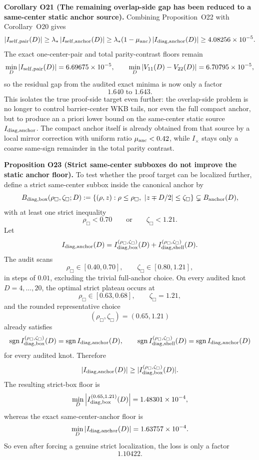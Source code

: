 \documentclass[aps,prd,onecolumn,notitlepage,nofootinbib,superscriptaddress,11pt,floatfix]{revtex4-2}
\begin{document}
\medskip\noindent\textbf{Corollary O21 (The remaining overlap-side gap has been reduced to a same-center static anchor source).}
Combining Proposition~O22 with Corollary~O20 gives
\[
|I_{\rm self,pair}(D)|
\ge
\lambda_\ast\,|I_{\rm self,anchor}(D)|
\ge
\lambda_\ast(1-\mu_{\rm anc})\,|I_{\rm diag,anchor}(D)|
\ge
4.08256\times10^{-5}.
\]
The exact one-center-pair and total parity-contrast floors remain
\[
\min_D |I_{\rm self,pair}(D)|=6.69675\times10^{-5},
\qquad
\min_D |V_{11}(D)-V_{22}(D)|=6.70795\times10^{-5},
\]
so the residual gap from the audited exact minima is now only a factor
\[
1.640\text{ to }1.643.
\]
This isolates the true proof-side target even further: the overlap-side problem is no longer to control barrier-center WKB tails, nor even the full compact anchor, but to produce an a priori lower bound on the same-center static source \(I_{\rm diag,anchor}\).  The compact anchor itself is already obtained from that source by a local mirror correction with uniform ratio \(\mu_{\rm anc}<0.42\), while \(I_\times\) stays only a coarse same-sign remainder in the total parity contrast.

\medskip\noindent\textbf{Proposition O23 (Strict same-center subboxes do not improve the static anchor floor).}
To test whether the proof target can be localized further, define a strict same-center subbox inside the canonical anchor by
\[
B_{\rm diag,box}(\rho_\Box,\zeta_\Box;D)
:=
\left\{(\rho,z):\rho\le \rho_\Box,\ |z\mp D/2|\le \zeta_\Box\right\}
\subsetneq B_{\rm anchor}(D),
\]
with at least one strict inequality
\[
\rho_\Box<0.70\qquad\text{or}\qquad \zeta_\Box<1.21.
\]
Let
\[
I_{\rm diag,anchor}(D)
=
I_{\rm diag,box}^{(\rho_\Box,\zeta_\Box)}(D)
+
I_{\rm diag,shell}^{(\rho_\Box,\zeta_\Box)}(D).
\]
The audit  scans
\[
\rho_\Box\in[0.40,0.70],\qquad
\zeta_\Box\in[0.80,1.21],
\]
in steps of \(0.01\), excluding the trivial full-anchor choice. On every audited knot \(D=4,\dots,20\), the optimal strict plateau occurs at
\[
\rho_\Box\in[0.63,0.68],\qquad \zeta_\Box=1.21,
\]
and the rounded representative choice
\[
(\rho_\Box,\zeta_\Box)=(0.65,1.21)
\]
already satisfies
\[
\operatorname{sgn} I_{\rm diag,box}^{(\rho_\Box,\zeta_\Box)}(D)
=
\operatorname{sgn} I_{\rm diag,anchor}(D),
\qquad
\operatorname{sgn} I_{\rm diag,shell}^{(\rho_\Box,\zeta_\Box)}(D)
=
\operatorname{sgn} I_{\rm diag,anchor}(D)
\]
for every audited knot. Therefore
\[
|I_{\rm diag,anchor}(D)|
\ge
|I_{\rm diag,box}^{(\rho_\Box,\zeta_\Box)}(D)|.
\]
The resulting strict-box floor is
\[
\min_D \left|I_{\rm diag,box}^{(0.65,1.21)}(D)\right|
=
1.48301\times10^{-4},
\]
whereas the exact same-center-anchor floor is
\[
\min_D |I_{\rm diag,anchor}(D)|
=
1.63757\times10^{-4}.
\]
So even after forcing a genuine strict localization, the loss is only a factor
\[
1.10422.
\]
\end{document}
